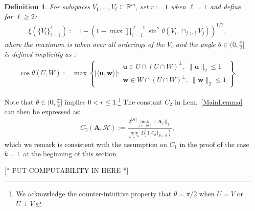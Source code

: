\documentclass[9pt,twocolumn]{pnas-new}
\newtheorem{definition}{Definition}
\begin{document}
\begin{definition}\label{SpecialSupportSet}\label{FriedrichsDefinition}
For subspaces $V_1, \ldots, V_\ell \subseteq \mathbb{R}^m$, set $r := 1$ when $\ell = 1$ and define for $\ell \geq 2$:
\begin{align*}
\xi(\{V_i\}_{i=1}^\ell) := 1 - \left(1 -  \max \prod_{i=1}^{\ell-1} \sin^2  \theta \left(V_i, \cap_{j>i} V_j \right)  \right)^{1/2},
\end{align*} 
%
where the maximum is taken over all orderings 
of the $V_i$ and the angle $\theta \in (0,\frac{\pi}{2}]$ is defined implicitly as \cite[Def.~9.4]{Deutsch12}:
\begin{align*}
\cos{\theta(U,W)} := \max\left\{ |\langle \mathbf{u}, \mathbf{w} \rangle|: \substack{ \mathbf{u} \in U \cap (U \cap W)^\perp, \ \|\mathbf{u}\|_2 \leq 1 \\ \mathbf{w} \in W \cap (U \cap W)^\perp, \  \|\mathbf{w}\|_2 \leq 1 } \right\}.
\end{align*}
\end{definition}
Note that $\theta \in (0,\frac{\pi}{2}]$ implies $0 < r \leq 1$.\footnote{We acknowledge the counter-intuitive property that $\theta =  \pi/2$ when $U = V$ or $U \perp V$.}  
The constant $C_2$ in Lem.~\ref{MainLemma} can then be expressed as:  
\begin{align}\label{Cdef2}
C_2(\mathbf{A}, \mathcal{H}) := \frac{ 2^{|\mathcal{H}|} \max_{j \in [m]} \|\mathbf{A}_j\|_2}{ \min_{\mathcal{G} \subseteq \mathcal{H}} \xi( \{ \bm{\mathcal{A}}_S \}_{S \in \mathcal{G}}) },
\end{align}
%
which we remark is consistent with the assumption on $C_1$ in the proof of the case $k=1$ at the beginning of this section.

[* PUT COMPUTABILITY IN HERE *]
\end{document}
